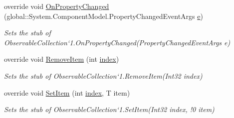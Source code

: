 \begin{DoxyCompactItemize}
override void \hyperlink{class_system_1_1_collections_1_1_object_model_1_1_fakes_1_1_stub_observable_collection_3_01_t_01_4_a04e9426fcc2a76d42fa343e1630f0c72}{On\-Property\-Changed} (global\-::\-System.\-Component\-Model.\-Property\-Changed\-Event\-Args \hyperlink{jquery-1_810_82_8min_8js_a2c038346d47955cbe2cb91e338edd7e1}{e})
\begin{DoxyCompactList}\small\item\em Sets the stub of Observable\-Collection`1.On\-Property\-Changed(\-Property\-Changed\-Event\-Args e)\end{DoxyCompactList}\item 
override void \hyperlink{class_system_1_1_collections_1_1_object_model_1_1_fakes_1_1_stub_observable_collection_3_01_t_01_4_a424e18cfe2c1913d22b1e1748a622822}{Remove\-Item} (int \hyperlink{jquery-1_810_82-vsdoc_8js_a75bb12d1f23302a9eea93a6d89d0193e}{index})
\begin{DoxyCompactList}\small\item\em Sets the stub of Observable\-Collection`1.Remove\-Item(\-Int32 index)\end{DoxyCompactList}\item 
override void \hyperlink{class_system_1_1_collections_1_1_object_model_1_1_fakes_1_1_stub_observable_collection_3_01_t_01_4_a3b9b7de8480c4f26569b00c87dba7505}{Set\-Item} (int \hyperlink{jquery-1_810_82-vsdoc_8js_a75bb12d1f23302a9eea93a6d89d0193e}{index}, T item)
\begin{DoxyCompactList}\small\item\em Sets the stub of Observable\-Collection`1.Set\-Item(Int32 index, !0 item)\end{DoxyCompactList}\end{DoxyCompactItemize}
